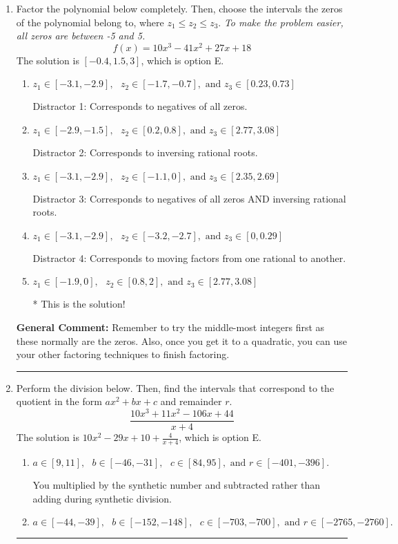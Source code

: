 \documentclass{extbook}[14pt]
\newcommand{\litem}[1]{\item #1

\rule{\textwidth}{0.4pt}}
\begin{document}
\begin{enumerate}\litem{
Factor the polynomial below completely. Then, choose the intervals the zeros of the polynomial belong to, where $z_1 \leq z_2 \leq z_3$. \textit{To make the problem easier, all zeros are between -5 and 5.}
\[ f(x) = 10x^{3} -41 x^{2} +27 x + 18 \]The solution is \( [-0.4, 1.5, 3] \), which is option E.\begin{enumerate}[label=\Alph*.]
\item \( z_1 \in [-3.1, -2.9], \text{   }  z_2 \in [-1.7, -0.7], \text{   and   } z_3 \in [0.23, 0.73] \)

 Distractor 1: Corresponds to negatives of all zeros.
\item \( z_1 \in [-2.9, -1.5], \text{   }  z_2 \in [0.2, 0.8], \text{   and   } z_3 \in [2.77, 3.08] \)

 Distractor 2: Corresponds to inversing rational roots.
\item \( z_1 \in [-3.1, -2.9], \text{   }  z_2 \in [-1.1, 0], \text{   and   } z_3 \in [2.35, 2.69] \)

 Distractor 3: Corresponds to negatives of all zeros AND inversing rational roots.
\item \( z_1 \in [-3.1, -2.9], \text{   }  z_2 \in [-3.2, -2.7], \text{   and   } z_3 \in [0, 0.29] \)

 Distractor 4: Corresponds to moving factors from one rational to another.
\item \( z_1 \in [-1.9, 0], \text{   }  z_2 \in [0.8, 2], \text{   and   } z_3 \in [2.77, 3.08] \)

* This is the solution!
\end{enumerate}

\textbf{General Comment:} Remember to try the middle-most integers first as these normally are the zeros. Also, once you get it to a quadratic, you can use your other factoring techniques to finish factoring.
}
\litem{
Perform the division below. Then, find the intervals that correspond to the quotient in the form $ax^2+bx+c$ and remainder $r$.
\[ \frac{10x^{3} +11 x^{2} -106 x + 44}{x + 4} \]The solution is \( 10x^{2} -29 x + 10 + \frac{4}{x + 4} \), which is option E.\begin{enumerate}[label=\Alph*.]
\item \( a \in [9, 11], \text{   } b \in [-46, -31], \text{   } c \in [84, 95], \text{   and   } r \in [-401, -396]. \)

 You multiplied by the synthetic number and subtracted rather than adding during synthetic division.
\item \( a \in [-44, -39], \text{   } b \in [-152, -148], \text{   } c \in [-703, -700], \text{   and   } r \in [-2765, -2760]. \)


\end{enumerate}}
\end{enumerate}
\end{document}
